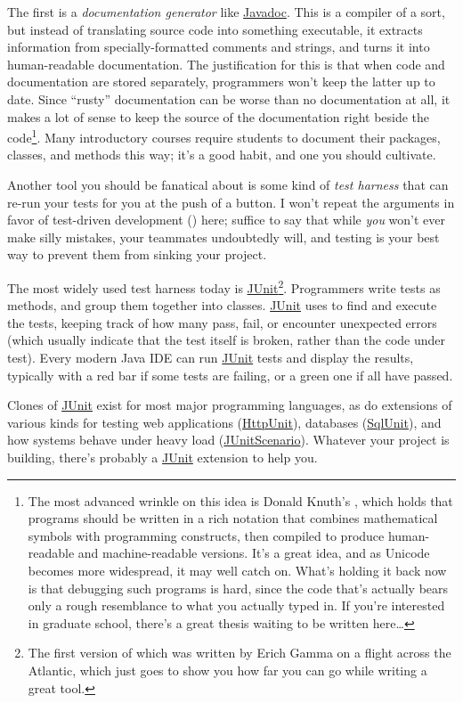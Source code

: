 \documentclass{report}
\begin{document}
The first is a \emph{documentation generator} like \url{Javadoc}.
This is a compiler of a sort, but instead of translating source code
into something executable, it extracts information from
specially-formatted comments and strings, and turns it into
human-readable documentation.  The justification for this is that when
code and documentation are stored separately, programmers won't keep
the latter up to date.  Since ``rusty'' documentation can be worse
than no documentation at all, it makes a lot of sense to keep the
source of the documentation right beside the code\footnote{The most
advanced wrinkle on this idea is Donald Knuth's , which holds that programs should be written in a rich
notation that combines mathematical symbols with programming
constructs, then compiled to produce human-readable and
machine-readable versions.  It's a great idea, and as Unicode becomes
more widespread, it may well catch on.  What's holding it back now is
that debugging such programs is hard, since the code that's actually
bears only a rough resemblance to what you actually typed in.  If
you're interested in graduate school, there's a great thesis waiting
to be written here{\ldots}}.  Many introductory courses require
students to document their packages, classes, and methods this way;
it's a good habit, and one you should cultivate.

Another tool you should be fanatical about is some kind of \emph{test
harness} that can re-run your tests for you at the push of a button.
I won't repeat the arguments in favor of test-driven development
() here; suffice to say that while \emph{you}
won't ever make silly mistakes, your teammates undoubtedly will, and
testing is your best way to prevent them from sinking your project.

The most widely used test harness today is \url{JUnit}\footnote{The
first version of which was written by Erich Gamma on a flight across
the Atlantic, which just goes to show you how far you can go while
writing a great tool.}.  Programmers write tests as methods, and group
them together into classes.  \url{JUnit} uses  to
find and execute the tests, keeping track of how many pass, fail, or
encounter unexpected errors (which usually indicate that the test
itself is broken, rather than the code under test).  Every modern Java
IDE can run \url{JUnit} tests and display the results, typically with
a red bar if some tests are failing, or a green one if all have
passed.

Clones of \url{JUnit} exist for most major programming languages, as
do extensions of various kinds for testing web applications
(\url{HttpUnit}), databases (\url{SqlUnit}), and how systems behave
under heavy load (\url{JUnitScenario}).  Whatever your project is
building, there's probably a \url{JUnit} extension to help you.
\end{document}
